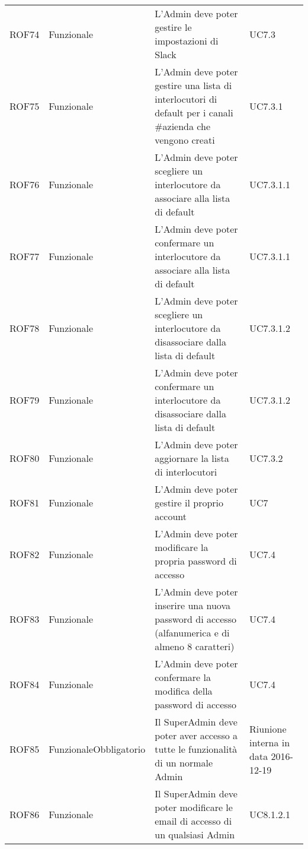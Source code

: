 \documentclass[../AnalisiDeiRequisiti_v3.0.0.tex]{subfiles}
\begin{document}
\begin{longtable}{p{2.5cm}!{\VRule[1pt]}p{2.5cm}!{\VRule[1pt]}p{5cm}!{\VRule[1pt]}p{2.5cm}}
	ROF74&Funzionale\newline  & L'Admin deve poter gestire le impostazioni di Slack & UC7.3 \\
	ROF75&Funzionale\newline  & L'Admin deve poter gestire una lista di interlocutori di default per i canali \#azienda che vengono creati & UC7.3.1 \\
	ROF76&Funzionale\newline  & L'Admin deve poter scegliere un interlocutore da associare alla lista di default & UC7.3.1.1 \\
	ROF77&Funzionale\newline  & L'Admin deve poter confermare un interlocutore da associare alla lista di default & UC7.3.1.1 \\
	ROF78&Funzionale\newline  & L'Admin deve poter scegliere un interlocutore da disassociare dalla lista di default & UC7.3.1.2 \\
	ROF79&Funzionale\newline  & L'Admin deve poter confermare un interlocutore da disassociare dalla lista di default & UC7.3.1.2 \\
	ROF80&Funzionale\newline  & L'Admin deve poter aggiornare la lista di interlocutori & UC7.3.2 \\
	ROF81&Funzionale\newline  & L'Admin deve poter gestire il proprio account & UC7 \\
	ROF82&Funzionale\newline  & L'Admin deve poter modificare la propria password di accesso & UC7.4 \\
	ROF83&Funzionale\newline  & L'Admin deve poter inserire una nuova password di accesso (alfanumerica e di almeno 8 caratteri) & UC7.4 \\
	ROF84&Funzionale\newline  & L'Admin deve poter confermare la modifica della password di accesso & UC7.4 \\
	ROF85&Funzionale\newline Obbligatorio & Il SuperAdmin deve poter aver accesso a tutte le funzionalità di un normale Admin & Riunione interna in data 2016-12-19 \\
	ROF86&Funzionale\newline  & Il SuperAdmin deve poter modificare le email di accesso di un qualsiasi Admin & UC8.1.2.1 \\

\end{longtable}
\end{document}
